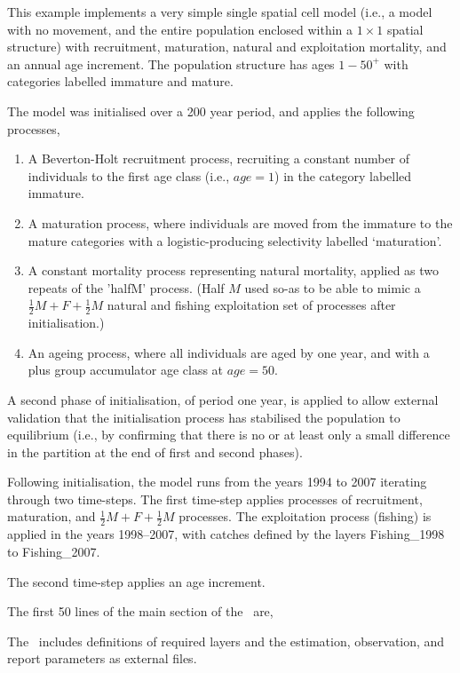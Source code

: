 This example implements a very simple single spatial cell model (i.e., a model with no movement, and the entire population enclosed within a $1 \times 1$ spatial structure) with recruitment, maturation, natural and exploitation mortality, and an annual age increment. The population structure has ages $1-50^{+}$ with categories labelled immature and mature. 

The model was initialised over a 200 year period, and applies the following processes,

\begin{enumerate}
\item A Beverton-Holt recruitment process, recruiting a constant number of individuals to the first age class (i.e., $age=1$) in the category labelled immature.
\item A maturation process, where individuals are moved from the immature to the mature categories with a logistic-producing selectivity labelled `maturation'.
\item A constant mortality process representing natural mortality, applied as two repeats of the 'halfM' process. (Half $M$ used so-as to be able to mimic a $\frac{1}{2} M + F + \frac{1}{2} M$ natural and fishing exploitation set of processes after initialisation.)
\item An ageing process, where all individuals are aged by one year, and with a plus group accumulator age class at $age=50$.
\end{enumerate}

A second phase of initialisation, of period one year, is applied to allow external validation that the initialisation process has stabilised the population to equilibrium (i.e., by confirming that there is no or at least only a small difference in the partition at the end of first and second phases).

Following initialisation, the model runs from the years 1994 to 2007 iterating through two time-steps. The first time-step applies processes of recruitment, maturation, and  $\frac{1}{2} M + F + \frac{1}{2} M$ processes. The exploitation process (fishing) is applied in the years 1998--2007, with catches defined by the layers Fishing\_1998 to Fishing\_2007. 

The second time-step applies an age increment.

The first 50 lines of the main section of the \config\ are,
 

The \config\ includes definitions of required layers and the estimation, observation, and report parameters as external files.

